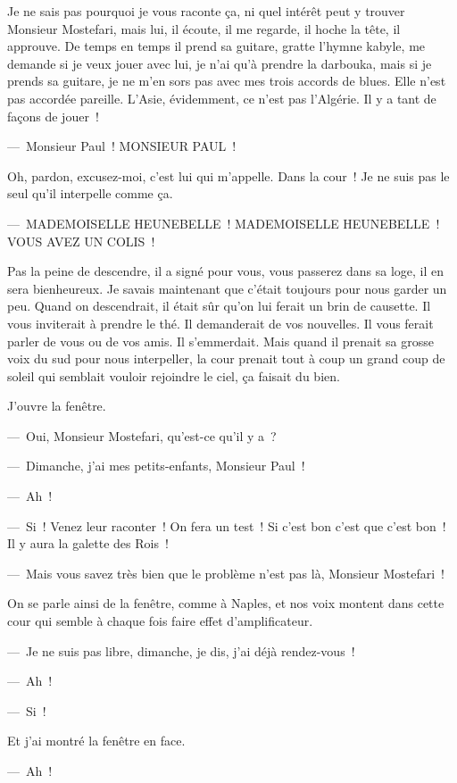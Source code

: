 \documentclass[twoside]{book} %
\begin{document}
\noindent Je ne sais pas pourquoi je vous raconte ça, ni quel intérêt peut y trouver Monsieur Mostefari, mais lui, il écoute, il me regarde, il hoche la tête, il approuve. De temps en temps il prend sa guitare, gratte l’hymne kabyle, me demande si je veux jouer avec lui, je n’ai qu’à prendre la darbouka, mais si je prends sa guitare, je ne m’en sors pas avec mes trois accords de blues. Elle n’est pas accordée pareille. L’Asie, évidemment, ce n’est pas l’Algérie. Il y a tant de façons de jouer !\par
— Monsieur Paul ! MONSIEUR PAUL !\par
Oh, pardon, excusez-moi, c’est lui qui m’appelle. Dans la cour ! Je ne suis pas le seul qu’il interpelle comme ça.\par
— MADEMOISELLE HEUNEBELLE ! MADEMOISELLE HEUNEBELLE ! VOUS AVEZ UN COLIS !\par
Pas la peine de descendre, il a signé pour vous, vous passerez dans sa loge, il en sera bienheureux. Je savais maintenant que c’était toujours pour nous garder un peu. Quand on descendrait, il était sûr qu’on lui ferait un brin de causette. Il vous inviterait à prendre le thé. Il demanderait de vos nouvelles. Il vous ferait parler de vous ou de vos amis. Il s’emmerdait. Mais quand il prenait sa grosse voix du sud pour nous interpeller, la cour prenait tout à coup un grand coup de soleil qui semblait vouloir rejoindre le ciel, ça faisait du bien.\par
J’ouvre la fenêtre.\par
— Oui, Monsieur Mostefari, qu’est-ce qu’il y a ?\par
— Dimanche, j’ai mes petits-enfants, Monsieur Paul !\par
— Ah !\par
— Si ! Venez leur raconter ! On fera un test ! Si c’est bon c’est que c’est bon ! Il y aura la galette des Rois !\par
— Mais vous savez très bien que le problème n’est pas là, Monsieur Mostefari !\par
On se parle ainsi de la fenêtre, comme à Naples, et nos voix montent dans cette cour qui semble à chaque fois faire effet d’amplificateur.\par
— Je ne suis pas libre, dimanche, je dis, j’ai déjà rendez-vous !\par
— Ah !\par
— Si !\par
Et j’ai montré la fenêtre en face.\par
— Ah !\par
\end{document}
